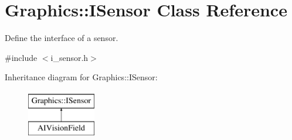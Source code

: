 \section{Graphics\+:\+:I\+Sensor Class Reference}
\label{class_graphics_1_1_i_sensor}


Define the interface of a sensor.  




{\ttfamily \#include $<$i\+\_\+sensor.\+h$>$}

Inheritance diagram for Graphics\+:\+:I\+Sensor\+:\begin{figure}[H]
\begin{center}
\leavevmode
\includegraphics[height=2.000000cm]{class_graphics_1_1_i_sensor}
\end{center}
\end{figure}
